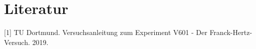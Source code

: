 \section{Literatur}

[1] TU Dortmund. Versuchsanleitung zum Experiment V601 - Der Franck-Hertz-Versuch. 2019.